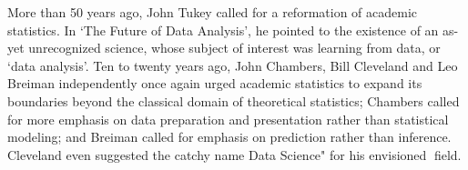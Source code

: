 More than 50 years ago, John Tukey called for a reformation of academic statistics. In `The
Future of Data Analysis', he pointed to the existence of an as-yet unrecognized science, whose
subject of interest was learning from data, or `data analysis'. Ten to twenty years ago, John
Chambers, Bill Cleveland and Leo Breiman independently once again urged academic statistics
to expand its boundaries beyond the classical domain of theoretical statistics; Chambers called
for more emphasis on data preparation and presentation rather than statistical modeling; and
Breiman called for emphasis on prediction rather than inference. Cleveland even suggested the
catchy name Data Science" for his envisioned field. \cite{donoho201750}
